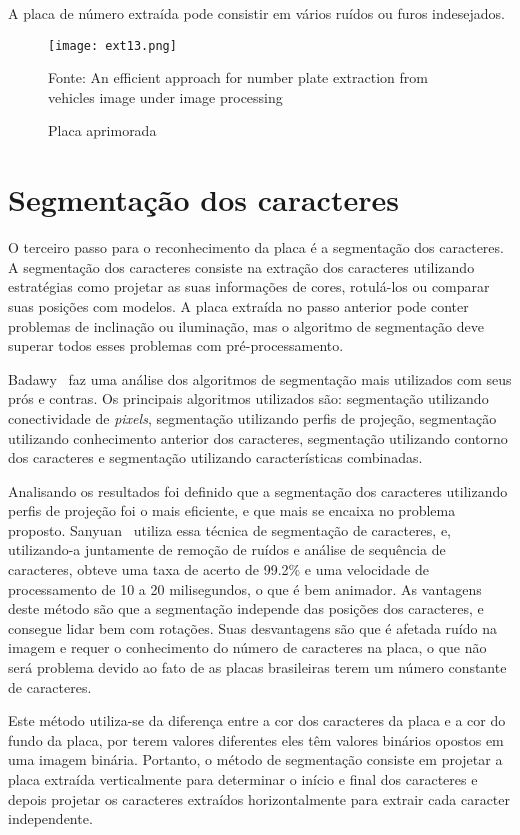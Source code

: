 A placa de número extraída pode consistir em vários ruídos ou furos indesejados.

\begin{figure}[H]
	\centering
	\texttt{[image: ext13.png]}
	\caption{Placa aprimorada}
Fonte: An efficient approach for number plate extraction from vehicles image under image processing~\cite{kaur2014efficient}
	\label{fig:ext_enhanced_number_plate}
\end{figure}

\section{Segmentação dos caracteres}
\label{sec:segmentacao}

O terceiro passo para o reconhecimento da placa é a segmentação dos caracteres.
A segmentação dos caracteres consiste na extração dos caracteres utilizando
estratégias como projetar as suas informações de cores, rotulá-los ou comparar
suas posições com modelos. A placa extraída no passo anterior pode conter
problemas de inclinação ou iluminação, mas o algoritmo de segmentação deve
superar todos esses problemas com pré-processamento.~\cite{s2013automatic}

Badawy~\cite{s2013automatic} faz uma análise dos algoritmos de segmentação mais
utilizados com seus prós e contras.  Os principais algoritmos utilizados são:
segmentação utilizando conectividade de \emph{pixels}, segmentação utilizando
perfis de projeção, segmentação utilizando conhecimento anterior dos caracteres,
segmentação utilizando contorno dos caracteres e segmentação utilizando
características combinadas.

Analisando os resultados foi definido que a segmentação dos caracteres
utilizando perfis de projeção foi o mais eficiente, e que mais se encaixa no
problema proposto. Sanyuan~\cite{sanyuan2004car} utiliza essa técnica de
segmentação de caracteres, e, utilizando-a juntamente de remoção de ruídos e
análise de sequência de caracteres, obteve uma taxa de acerto de 99.2\% e uma
velocidade de processamento de 10 a 20 milisegundos, o que é bem animador. As
vantagens deste método são que a segmentação independe das posições dos
caracteres, e consegue lidar bem com rotações. Suas desvantagens são que é
afetada ruído na imagem e requer o conhecimento do número de caracteres na
placa, o que não será problema devido ao fato de as placas brasileiras terem um
número constante de caracteres.

Este método utiliza-se da diferença entre a cor dos caracteres da placa e a cor
do fundo da placa, por terem valores diferentes eles têm valores binários
opostos em uma imagem binária. Portanto, o método de segmentação consiste em
projetar a placa extraída verticalmente para determinar o início e final dos
caracteres e depois projetar os caracteres extraídos horizontalmente para
extrair cada caracter independente.


